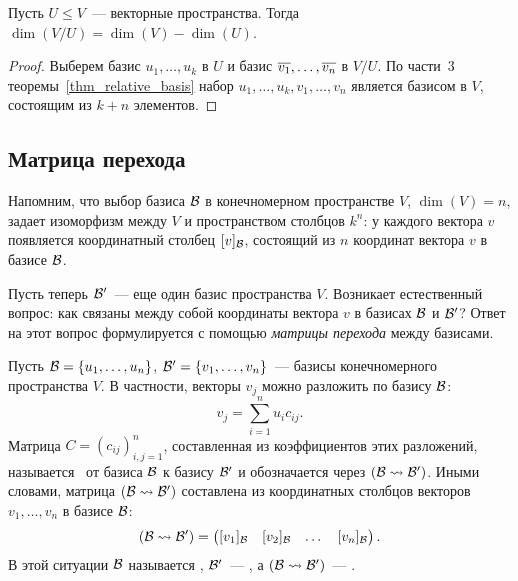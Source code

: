 \begin{corollary}
Пусть $U\leq V$~--- векторные пространства. Тогда
$\dim(V/U)=\dim(V)-\dim(U)$.
\end{corollary}
\begin{proof}
Выберем базис $u_1,\dots,u_k$ в $U$ и базис $\overline{v_1},\dots,\overline{v_n}$
в $V/U$. По части~3 теоремы~\ref{thm_relative_basis} набор
$u_1,\dots,u_k,v_1,\dots,v_n$ является базисом в $V$, состоящим из
$k+n$ элементов.
\end{proof}


\subsection{Матрица перехода}


Напомним, что выбор базиса $\mathcal B$ в конечномерном пространстве $V$,
$\dim(V)=n$, задает
изоморфизм между $V$ и пространством столбцов $k^n$: у каждого
вектора $v$ появляется координатный столбец $[v]_{\mathcal B}$, состоящий
из $n$ координат вектора $v$ в базисе $\mathcal B$.

Пусть теперь $\mathcal B'$~--- еще один базис пространства $V$. Возникает
естественный вопрос: как связаны между собой координаты вектора $v$ в
базисах $\mathcal B$ и $\mathcal B'$? Ответ на этот вопрос формулируется с
помощью {\em матрицы перехода} между базисами.

\begin{definition}\label{def:change_of_basis_matrix}
Пусть $\mathcal B=\{u_1,\dots,u_n\}$, $\mathcal B'=\{v_1,\dots,v_n\}$~--- базисы
конечномерного пространства $V$. В частности, векторы $v_j$ можно
разложить по базису $\mathcal B$:
$$
v_j=\sum_{i=1}^n u_ic_{ij}.
$$
Матрица $C=(c_{ij})_{i,j=1}^n$, составленная из коэффициентов этих
разложений, называется~
от базиса $\mathcal B$ к
базису $\mathcal B'$ и обозначается через $(\mathcal B\rightsquigarrow\mathcal B')$. Иными
словами, матрица $(\mathcal B\rightsquigarrow\mathcal B')$ составлена из координатных
столбцов векторов $v_1,\dots,v_n$ в базисе $\mathcal B$:
$$
(\mathcal B\rightsquigarrow\mathcal B')=\begin{pmatrix}[v_1]_{\mathcal B} & [v_2]_{\mathcal B} & \dots
  & [v_n]_{\mathcal B}\end{pmatrix}.
$$
В этой ситуации $\mathcal B$ называется , $\mathcal B'$~---
, а $(\mathcal B\rightsquigarrow\mathcal B')$~--- .
\end{definition}

